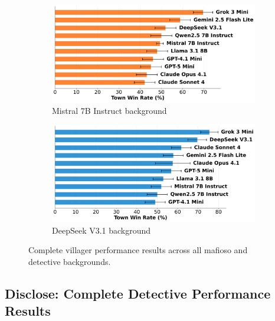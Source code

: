 \documentclass{article}
\begin{document}
\begin{figure}[htbp]
    \begin{subfigure}[b]{0.48\textwidth}
        \centering
        \includegraphics[width=\textwidth]{../results/villager_mistral_7b_instruct_db_benchmark.png}
        \caption{Mistral 7B Instruct background}
        \label{fig:villager_mistral_appendix}
    \end{subfigure}
    \hfill
    \begin{subfigure}[b]{0.48\textwidth}
        \centering
        \includegraphics[width=\textwidth]{../results/villager_deepseek_v3.1_db_benchmark.png}
        \caption{DeepSeek V3.1 background}
        \label{fig:villager_deepseek_appendix}
    \end{subfigure}
    \caption{Complete villager performance results across all mafioso and detective backgrounds.}
    \label{fig:villager_complete}
\end{figure}

\subsection{Disclose: Complete Detective Performance Results}
\end{document}

